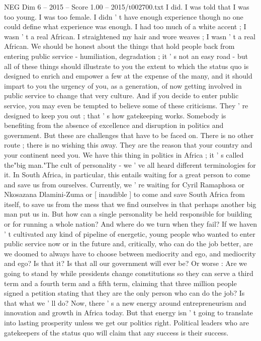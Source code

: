 \begin{textsample}{NEG Dim 6 – 2015 – Score 1.00 – 2015/t002700.txt}
I did.
I was told that I was too young.
I was too female.
I didn ' t have enough experience though no one could define what experience was enough.
I had too much of a white accent ; I wasn ' t a real African.
I straightened my hair and wore weaves ; I wasn ' t a real African.
We should be honest about the things that hold people back from entering public service - humiliation, degradation ; it ' s not an easy road - but all of these things should illustrate to you the extent to which the status quo is designed to enrich and empower a few at the expense of the many, and it should impart to you the urgency of you, as a generation, of now getting involved in public service to change that very culture.
And if you decide to enter public service, you may even be tempted to believe some of these criticisms.
They ' re designed to keep you out ; that ' s how gatekeeping works.
Somebody is benefiting from the absence of excellence and disruption in politics and government.
But these are challenges that have to be faced on.
There is no other route ; there is no wishing this away.
They are the reason that your country and your continent need you.
We have this thing in politics in Africa ; it ' s called the"big man."The cult of personality - we ' ve all heard different terminologies for it.
In South Africa, in particular, this entails waiting for a great person to come and save us from ourselves.
Currently, we ' re waiting for Cyril Ramaphosa or Nkosazana Dlamini-Zuma or [ inaudible ] to come and save South Africa from itself, to save us from the mess that we find ourselves in that perhaps another big man put us in.
But how can a single personality be held responsible for building or for running a whole nation?
And where do we turn when they fail?
If we haven ' t cultivated any kind of pipeline of energetic, young people who wanted to enter public service now or in the future and, critically, who can do the job better, are we doomed to always have to choose between mediocrity and ego, and mediocrity and ego?
Is that it?
Is that all our government will ever be?
Or worse : Are we going to stand by while presidents change constitutions so they can serve a third term and a fourth term and a fifth term, claiming that three million people signed a petition stating that they are the only person who can do the job?
Is that what we ' ll do?
Now, there ' s a new energy around entrepreneurism and innovation and growth in Africa today.
But that energy isn ' t going to translate into lasting prosperity unless we get our politics right.
Political leaders who are gatekeepers of the status quo will claim that any success is their success.

\end{textsample}
